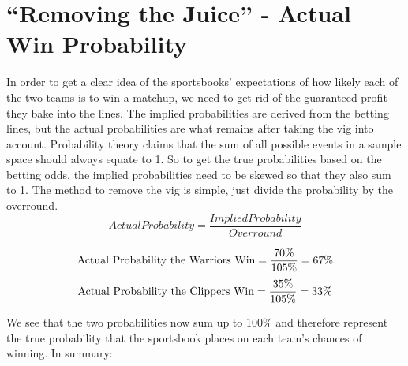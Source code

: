 \documentclass [MS] {uclathes}
\begin{document}
\section{``Removing the Juice'' - Actual Win Probability}
In order to get a clear idea of the sportsbooks' expectations of how likely each of the two teams is to win a matchup, we need to get rid of the guaranteed profit they bake into the lines. The implied probabilities are derived from the betting lines, but the actual probabilities are what remains after taking the vig into account. Probability theory claims that the sum of all possible events in a sample space should always equate to 1. So to get the true probabilities based on the betting odds, the implied probabilities need to be skewed so that they also sum to 1. The method to remove the vig is simple, just divide the probability by the overround. \\

$$
\displaystyle
Actual Probability = \frac{Implied Probability}
{Overround}
$$

$$
\text{Actual Probability the Warriors Win} = \frac{70\%}{105\%} = 67\% \\
$$
$$
\text{Actual Probability the Clippers Win} = \frac{35\%}{105\%} = 33\% \\
$$

We see that the two probabilities now sum up to 100\% and therefore represent the true probability that the sportsbook places on each team's chances of winning. In summary: \\

\begin{table}[ht!]
\caption{Summary of betting values for sample wager}
\label{tab:bet-summary-table}
\end{table}
\end{document}
